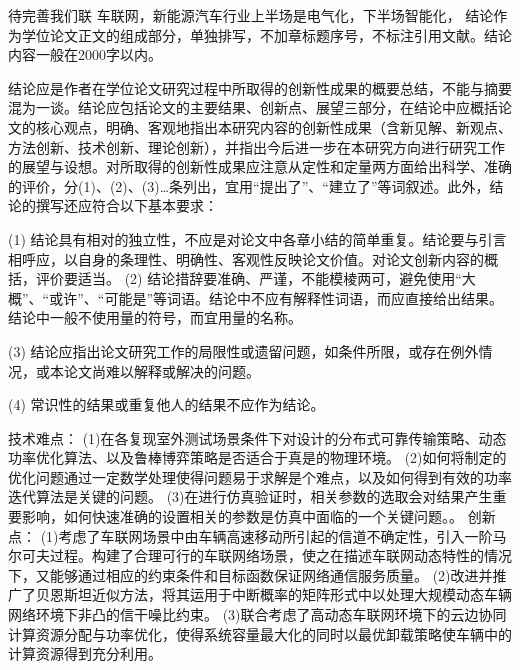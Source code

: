 \makeatletter
{}
  \pagestyle{fancy}%
  \fancyhf{}
\makeatother

\begin{conclusion} \label{chap:conclusion}
\textcolor[RGB]{18,20,168}{待完善我们联
车联网，新能源汽车行业上半场是电气化，下半场智能化，
结论作为学位论文正文的组成部分，单独排写，不加章标题序号，不标注引用文献。结论内容一般在2000字以内。}


结论应是作者在学位论文研究过程中所取得的创新性成果的概要总结，不能与摘要混为一谈。结论应包括论文的主要结果、创新点、展望三部分，在结论中应概括论文的核心观点，明确、客观地指出本研究内容的创新性成果（含新见解、新观点、方法创新、技术创新、理论创新），并指出今后进一步在本研究方向进行研究工作的展望与设想。对所取得的创新性成果应注意从定性和定量两方面给出科学、准确的评价，分(1)、(2)、(3)…条列出，宜用“提出了”、“建立了”等词叙述。此外，结论的撰写还应符合以下基本要求：

(1) 结论具有相对的独立性，不应是对论文中各章小结的简单重复。结论要与引言相呼应，以自身的条理性、明确性、客观性反映论文价值。对论文创新内容的概括，评价要适当。
(2) 结论措辞要准确、严谨，不能模棱两可，避免使用“大概”、“或许”、“可能是”等词语。结论中不应有解释性词语，而应直接给出结果。结论中一般不使用量的符号，而宜用量的名称。

(3) 结论应指出论文研究工作的局限性或遗留问题，如条件所限，或存在例外情况，或本论文尚难以解释或解决的问题。

(4) 常识性的结果或重复他人的结果不应作为结论。

技术难点：
(1)在各复现室外测试场景条件下对设计的分布式可靠传输策略、动态功率优化算法、以及鲁棒博弈策略是否适合于真是的物理环境。
(2)如何将制定的优化问题通过一定数学处理使得问题易于求解是个难点，以及如何得到有效的功率迭代算法是关键的问题。
(3)在进行仿真验证时，相关参数的选取会对结果产生重要影响，如何快速准确的设置相关的参数是仿真中面临的一个关键问题。。
创新点：
(1)考虑了车联网场景中由车辆高速移动所引起的信道不确定性，引入一阶马尔可夫过程。构建了合理可行的车联网络场景，使之在描述车联网动态特性的情况下，又能够通过相应的约束条件和目标函数保证网络通信服务质量。
(2)改进并推广了贝恩斯坦近似方法，将其运用于中断概率的矩阵形式中以处理大规模动态车辆网络环境下非凸的信干噪比约束。
(3)联合考虑了高动态车联网环境下的云边协同计算资源分配与功率优化，使得系统容量最大化的同时以最优卸载策略使车辆中的计算资源得到充分利用。


\end{conclusion}

